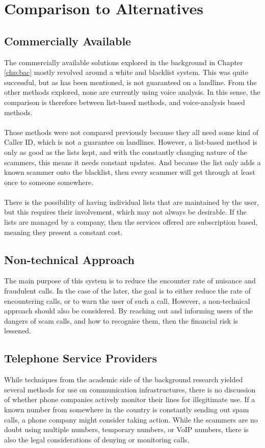 \documentclass[main.tex]{subfiles}
\begin{document}
\section{Comparison to Alternatives}
\subsection{Commercially Available}
The commercially available solutions explored in the background in Chapter \ref{chp:bac} mostly revolved around a white and blacklist system. This was quite successful, but as has been mentioned, is not guaranteed on a landline. From the other methods explored, none are currently using voice analysis. In this sense, the comparison is therefore between list-based methods, and voice-analysis based methods.
\\\\
Those methods were not compared previously because they all need some kind of Caller ID, which is not a guarantee on landlines. However, a list-based method is only as good as the lists kept, and with the constantly changing nature of the scammers, this means it needs constant updates. And because the list only adds a known scammer onto the blacklist, then every scammer will get through at least once to someone somewhere.
\\\\
There is the possibility of having individual lists that are maintained by the user, but this requires their involvement, which may not always be desirable. If the lists are managed by a company, then the services offered are subscription based, meaning they present a constant cost.

\subsection{Non-technical Approach}
The main purpose of this system is to reduce the encounter rate of nuisance and fraudulent calls. In the case of the later, the goal is to either reduce the rate of encountering calls, or to warn the user of such a call. However, a non-technical approach should also be considered. By reaching out and informing users of the dangers of scam calls, and how to recognise them, then the financial risk is lessened.

\subsection{Telephone Service Providers}
While techniques from the academic side of the background research yielded several methods for use on communication infrastructures, there is no discussion of whether phone companies actively monitor their lines for illegitimate use. If a known number from somewhere in the country is constantly sending out spam calls, a phone company might consider taking action. While the scammers are no doubt using multiple numbers, temporary numbers, or VoIP numbers, there is also the legal considerations of denying or monitoring calls.
\end{document}
